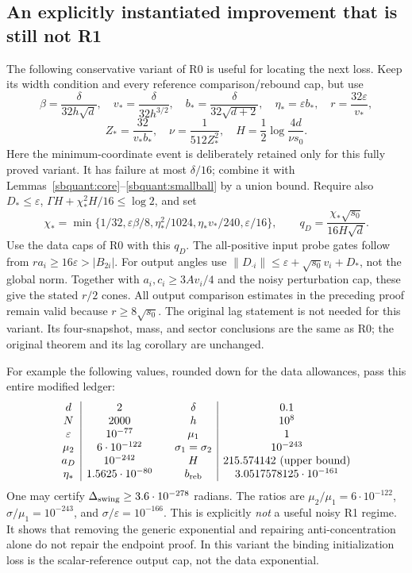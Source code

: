\documentclass{article} %
\theoremstyle{plain}
\theoremstyle{definition}
\theoremstyle{remark}
\begin{document}
\subsection{An explicitly instantiated improvement that is still not R1}

The following conservative variant of R0 is useful for locating the next
loss. Keep its width condition and every reference comparison/rebound cap,
but use
\[
 \beta=\frac{\delta}{32h\sqrt d},\quad
 v_* =\frac{\delta}{32h^{3/2}},\quad
 b_* =\frac{\delta}{32\sqrt{d+2}},\quad
 \eta_* =\varepsilon b_*,\quad r=\frac{32\varepsilon}{v_*},
\]
\[
 Z_* =\frac{32}{v_*b_*},\quad
 \nu=\frac1{512Z_*^2},\quad
 H=\frac12\log\frac{4d}{\nu s_0}.
\]
Here the minimum-coordinate event is deliberately retained only for this
fully proved variant. It has failure at most $\delta/16$; combine it with
Lemmas~\ref{sbquant:core}--\ref{sbquant:smallball} by a union bound.
Require also $D_*\le\varepsilon$,
$\Gamma H+\chi_*^2H/16\le\log2$, and set
\[
 \chi_* =\min\{1/32,\varepsilon\beta/8,\eta_*^2/1024,
                   \eta_*v_*/240,\varepsilon/16\},\qquad
 q_D=\frac{\chi_*\sqrt{s_0}}{16H\sqrt d}.
\]
Use the data caps of R0 with this $q_D$. The all-positive input probe
gates follow from $ra_i\ge16\varepsilon>|B_{2i}|$.
For output angles use
$\|D_{\cdot i}\|\le\varepsilon+\sqrt{s_0}v_i+D_*$,
not the global norm. Together with $a_i,c_i\ge3Av_i/4$ and the
noisy perturbation cap, these give the stated $r/2$ cones.
All output comparison estimates in the preceding proof remain valid
because $r\ge8\sqrt{s_0}$. The original lag statement is not needed for
this variant. Its four-snapshot, mass, and sector conclusions are the
same as R0; the original theorem and its lag corollary are unchanged.

For example the following values, rounded down for the data allowances,
pass this entire modified ledger:
\[
\begin{array}{c|c@{\qquad}c|c}
 d&2&\delta&0.1\\
 N&2000&h&10^8\\
 \varepsilon&10^{-77}&\mu_1&1\\
 \mu_2&6\cdot10^{-122}&\sigma_1=\sigma_2&10^{-243}\\
 a_D&10^{-242}&H&215.574142\text{ (upper bound)}\\
 \eta_*&1.5625\cdot10^{-80}&b_{\rm reb}&3.0517578125\cdot10^{-161}
\end{array}
\]
One may certify $\Delta_{\rm swing}\ge3.6\cdot10^{-278}$ radians.
The ratios are $\mu_2/\mu_1=6\cdot10^{-122}$,
$\sigma/\mu_1=10^{-243}$, and $\sigma/\varepsilon=10^{-166}$.
This is explicitly \emph{not} a useful noisy R1 regime. It shows that
removing the generic exponential and repairing anti-concentration alone
do not repair the endpoint proof. In this variant the binding initialization
loss is the scalar-reference output cap, not the data exponential.
\end{document}
